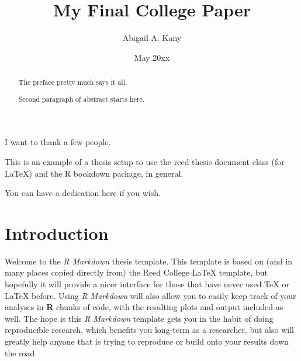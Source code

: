 \documentclass[12pt,twoside]{reedthesis}
\title{My Final College Paper}
\author{Abigail A. Kany}
\date{May 20xx}
\begin{document}
  \maketitle

\frontmatter %
\pagestyle{empty} %
  \begin{acknowledgements}
    I want to thank a few people.
  \end{acknowledgements}
  \begin{preface}
    This is an example of a thesis setup to use the reed thesis document class
    (for LaTeX) and the R bookdown package, in general.
  \end{preface}
  \hypersetup{linkcolor=black}
  \setcounter{tocdepth}{2}
  \tableofcontents

  \listoftables

  \listoffigures
  \begin{abstract}
    The preface pretty much says it all.
    
    \par
    
    Second paragraph of abstract starts here.
  \end{abstract}
  \begin{dedication}
    You can have a dedication here if you wish.
  \end{dedication}
\mainmatter %
\pagestyle{fancyplain} %

\hypertarget{introduction}{%
\chapter*{Introduction}\label{introduction}}

Welcome to the \emph{R Markdown} thesis template. This template is based on (and in many places copied directly from) the Reed College LaTeX template, but hopefully it will provide a nicer interface for those that have never used TeX or LaTeX before. Using \emph{R Markdown} will also allow you to easily keep track of your analyses in \textbf{R} chunks of code, with the resulting plots and output included as well. The hope is this \emph{R Markdown} template gets you in the habit of doing reproducible research, which benefits you long-term as a researcher, but also will greatly help anyone that is trying to reproduce or build onto your results down the road.
\end{document}
